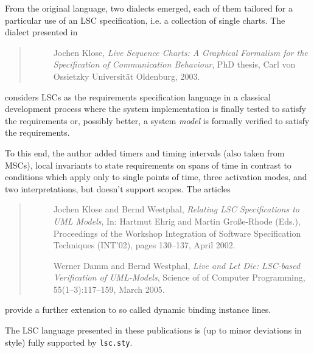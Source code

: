 \documentclass{article}
\newcommand{\sty}[1]{\texttt{#1.sty}}
\newcommand{\lscsty}{\sty{lsc}}
\begin{document}
\medskip

From the original language, two 
dialects emerged, each of them tailored for a
particular use of an LSC specification, i.e. a collection of single charts.
%
The dialect presented in
%
\begin{quote}
\small
\begin{description}
\item[\cite{Klose2003}]
  Jochen Klose,
  \emph{Live Sequence Charts: A Graphical Formalism for the Specification of Communication Behaviour},
  PhD thesis, {Carl von Ossietzky Universit\"{a}t Oldenburg}, 2003.
\end{description}
\end{quote}
%
considers LSCs as the requirements specification language in a classical
development process where the system implementation is finally tested to
satisfy the requirements or, possibly better, a system \emph{model} is
formally verified to satisfy the requirements.

To this end, the author added 
timers and 
timing intervals (also taken from MSCs), 
local invariants to state requirements on spans of time in contrast to
conditions which apply only to single points of time, three 
activation modes, and two 
interpretations, but doesn't support 
scopes.
%
The articles
%
\begin{quote}
\small
\begin{description}
\item[\cite{KloseWestphal2002}]
  Jochen Klose and Bernd Westphal,
  \emph{Relating {LSC} Specifications to {UML} Models},
  In: Hartmut Ehrig and Martin Gro\ss{}e-Rhode (Eds.),
  Proceedings of the Workshop Integration of Software Specification Techniques (INT'02),
  pages 130--137, April 2002.
\item[\cite{DammWestphal2005}]
  Werner Damm and Bernd Westphal,
  \emph{Live and Let Die: {LSC}-based Verification of {UML}-Models},
  Science of of Computer Programming,
  55(1--3):117--159, March 2005.
\end{description}
\end{quote}
%
provide a further extension to so called 
dynamic binding instance lines.

The LSC language presented in these publications is (up to minor deviations in
style) fully supported by \lscsty{}.
\end{document}
